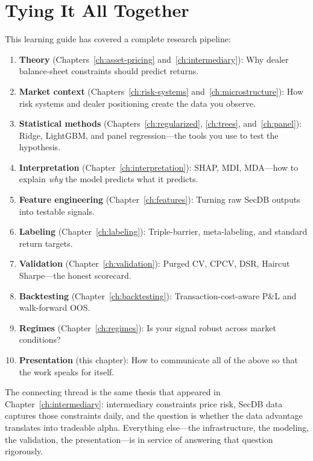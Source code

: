 \section{Tying It All Together}
\label{sec:presenting:synthesis}

This learning guide has covered a complete research pipeline:

\begin{enumerate}[leftmargin=1.5em]
  \item \textbf{Theory} (Chapters~\ref{ch:asset-pricing}
    and~\ref{ch:intermediary}):  Why dealer balance-sheet constraints
    should predict returns.
  \item \textbf{Market context}
    (Chapters~\ref{ch:risk-systems} and~\ref{ch:microstructure}):
    How risk systems and dealer positioning create the data you observe.
  \item \textbf{Statistical methods}
    (Chapters~\ref{ch:regularized}, \ref{ch:trees},
    and~\ref{ch:panel}):  Ridge, LightGBM, and panel regression---the
    tools you use to test the hypothesis.
  \item \textbf{Interpretation} (Chapter~\ref{ch:interpretation}):
    SHAP, MDI, MDA---how to explain \emph{why} the model predicts what
    it predicts.
  \item \textbf{Feature engineering} (Chapter~\ref{ch:features}):
    Turning raw SecDB outputs into testable signals.
  \item \textbf{Labeling} (Chapter~\ref{ch:labeling}):  Triple-barrier,
    meta-labeling, and standard return targets.
  \item \textbf{Validation} (Chapter~\ref{ch:validation}):  Purged CV,
    CPCV, DSR, Haircut Sharpe---the honest scorecard.
  \item \textbf{Backtesting} (Chapter~\ref{ch:backtesting}):
    Transaction-cost-aware P\&L and walk-forward OOS.
  \item \textbf{Regimes} (Chapter~\ref{ch:regimes}):  Is your signal
    robust across market conditions?
  \item \textbf{Presentation} (this chapter):  How to communicate
    all of the above so that the work speaks for itself.
\end{enumerate}

The connecting thread is the same thesis that appeared in Chapter~\ref{ch:intermediary}:
intermediary constraints price risk, SecDB data captures those constraints
daily, and the question is whether the data advantage translates into
tradeable alpha.  Everything else---the infrastructure, the modeling, the
validation, the presentation---is in service of answering that question
rigorously.

